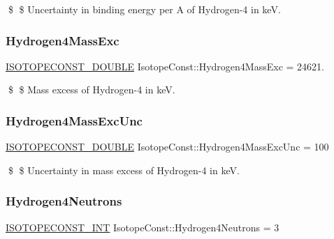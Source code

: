 \$ \$ Uncertainty in binding energy per A of Hydrogen-\/4 in keV. \mbox{\label{group___isotope_const-_hydrogen-_h4_gade00c2354b4755c843c1370c0c438f38}} 
\subsubsection{\texorpdfstring{Hydrogen4\+Mass\+Exc}{Hydrogen4MassExc}}
{\footnotesize\ttfamily \mbox{\hyperlink{group___isotope_const-_macros_ga8f45a7272ce02c0b4c65c44636ed719a}{I\+S\+O\+T\+O\+P\+E\+C\+O\+N\+S\+T\+\_\+\+D\+O\+U\+B\+LE}} Isotope\+Const\+::\+Hydrogen4\+Mass\+Exc = 24621.}

\$ \$ Mass excess of Hydrogen-\/4 in keV. \mbox{\label{group___isotope_const-_hydrogen-_h4_ga6739e44f49090dcc44c86c6114b85f6b}} 
\subsubsection{\texorpdfstring{Hydrogen4\+Mass\+Exc\+Unc}{Hydrogen4MassExcUnc}}
{\footnotesize\ttfamily \mbox{\hyperlink{group___isotope_const-_macros_ga8f45a7272ce02c0b4c65c44636ed719a}{I\+S\+O\+T\+O\+P\+E\+C\+O\+N\+S\+T\+\_\+\+D\+O\+U\+B\+LE}} Isotope\+Const\+::\+Hydrogen4\+Mass\+Exc\+Unc = 100}

\$ \$ Uncertainty in mass excess of Hydrogen-\/4 in keV. \mbox{\label{group___isotope_const-_hydrogen-_h4_gaecc7a2b2b7b9267319f6b9ff6d30691f}} 
\subsubsection{\texorpdfstring{Hydrogen4\+Neutrons}{Hydrogen4Neutrons}}
{\footnotesize\ttfamily \mbox{\hyperlink{group___isotope_const-_macros_ga5f18360b3e99483a35c32d789e62621c}{I\+S\+O\+T\+O\+P\+E\+C\+O\+N\+S\+T\+\_\+\+I\+NT}} Isotope\+Const\+::\+Hydrogen4\+Neutrons = 3}

